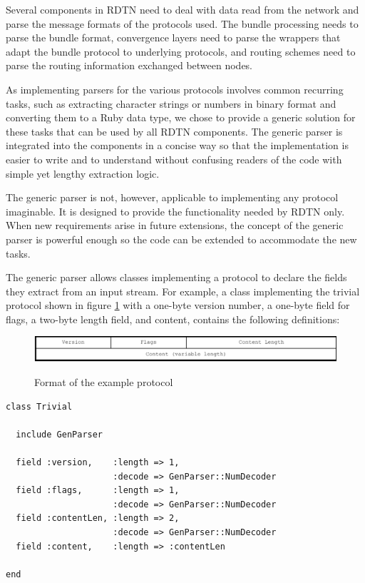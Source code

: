 \documentclass[a4paper]{article}
\begin{document}
Several components in RDTN need to deal with data read from the network and
parse the message formats of the protocols used. The bundle processing needs to
parse the bundle format, convergence layers need to parse the wrappers that
adapt the bundle protocol to underlying protocols, and routing schemes need to
parse the routing information exchanged between nodes.

As implementing parsers for the various protocols involves common recurring
tasks, such as extracting character strings or numbers in binary format and
converting them to a Ruby data type, we chose to provide a generic solution for
these tasks that can be used by all RDTN components. The generic parser is
integrated into the components in a concise way so that the implementation is
easier to write and to understand without confusing readers of the code with
simple yet lengthy extraction logic. 

The generic parser is not, however, applicable to implementing any protocol
imaginable. It is designed to provide the functionality needed by RDTN only.
When new requirements arise in future extensions, the concept of the generic
parser is powerful enough so the code can be extended to accommodate the new
tasks.

The generic parser allows classes implementing a protocol to declare the fields
they extract from an input stream. For example, a class implementing the trivial
protocol shown in figure \ref{fig.example-format} with a one-byte version
number, a one-byte field for flags, a two-byte length field, and content,
contains the following definitions:

\begin{figure}[h]
\begin{center}
\includegraphics[width=0.9\columnwidth]{example-format.pdf}\\
\caption{\label{fig.example-format} Format of the example protocol}
\end{center}
\end{figure}

\begin{verbatim}
class Trivial

  include GenParser

  field :version,    :length => 1,
                     :decode => GenParser::NumDecoder
  field :flags,      :length => 1,
                     :decode => GenParser::NumDecoder
  field :contentLen, :length => 2,
                     :decode => GenParser::NumDecoder
  field :content,    :length => :contentLen

end
\end{verbatim}
\end{document}
